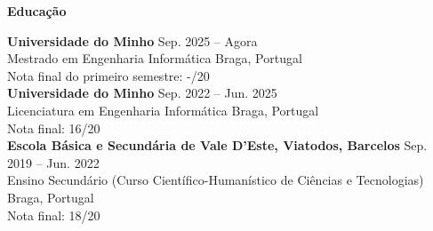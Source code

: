 \noindent\textbf{Educação}
\noindent\hrulefill
\vspace{0.25em}
\begin{adjustwidth}{1.5em}{0em}
\textbf{Universidade do Minho} \hfill Sep. 2025 -- Agora \\
Mestrado em Engenharia Informática \hfill Braga, Portugal \\
Nota final do primeiro semestre: -/20
\vspace{0.5em}
\\
\textbf{Universidade do Minho} \hfill Sep. 2022 -- Jun. 2025 \\
Licenciatura em Engenharia Informática \hfill Braga, Portugal \\
Nota final: 16/20
\vspace{0.5em}
\\
\textbf{Escola Básica e Secundária de Vale D’Este, Viatodos, Barcelos} \hfill Sep. 2019 -- Jun. 2022 \\
Ensino Secundário (Curso Científico-Humanístico de Ciências e Tecnologias) \hfill Braga, Portugal \\
Nota final: 18/20
\end{adjustwidth}
\vspace{0.25em}